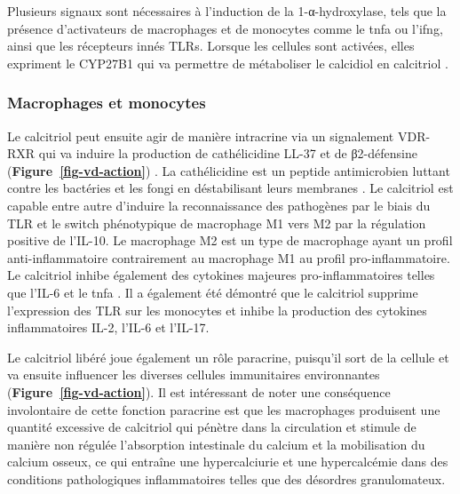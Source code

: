 \documentclass[
  a4paper,
  DIV=11,
  numbers=noendperiod,
  listof=totoc]{scrreprt}
\begin{document}
Plusieurs signaux sont nécessaires à l'induction de la 1-α-hydroxylase,
tels que la présence d'activateurs de macrophages et de monocytes comme
le \ac{tnfa} ou l'\ac{ifng}, ainsi que les récepteurs innés \acp{TLR}.
Lorsque les cellules sont activées, elles expriment le \ac{CYP27B1} qui
va permettre de métaboliser le calcidiol en calcitriol
\autocite{Liu.2006,Charoenngam.2020}.

\hypertarget{macrophages-et-monocytes}{%
\subsubsection{Macrophages et
monocytes}\label{macrophages-et-monocytes}}

Le calcitriol peut ensuite agir de manière intracrine via un signalement
VDR-RXR qui va induire la production de cathélicidine LL-37 et de
β2-défensine (\textbf{Figure~\ref{fig-vd-action}})
\autocite{Caprio.2017}. La cathélicidine est un peptide antimicrobien
luttant contre les bactéries et les fongi en déstabilisant leurs
membranes \autocite{Charoenngam.2020}. Le calcitriol est capable entre
autre d'induire la reconnaissance des pathogènes par le biais du
\ac{TLR} et le switch phénotypique de macrophage M1 vers M2 par la
régulation positive de l'\ac{IL-10}. Le macrophage M2 est un type de
macrophage ayant un profil anti-inflammatoire contrairement au
macrophage M1 au profil pro-inflammatoire. Le calcitriol inhibe
également des cytokines majeures pro-inflammatoires telles que
l'\ac{IL-6} et le \ac{tnfa} \autocite{Meza-Meza.2022,Caprio.2017}. Il a
également été démontré que le calcitriol supprime l'expression des
\ac{TLR} sur les monocytes et inhibe la production des cytokines
inflammatoires \ac{IL-2}, l'\ac{IL-6} et l'\ac{IL-17}.

Le calcitriol libéré joue également un rôle paracrine, puisqu'il sort de
la cellule et va ensuite influencer les diverses cellules immunitaires
environnantes (\textbf{Figure~\ref{fig-vd-action}}). Il est intéressant
de noter une conséquence involontaire de cette fonction paracrine est
que les macrophages produisent une quantité excessive de calcitriol qui
pénètre dans la circulation et stimule de manière non régulée
l'absorption intestinale du calcium et la mobilisation du calcium
osseux, ce qui entraîne une hypercalciurie et une hypercalcémie dans des
conditions pathologiques inflammatoires telles que des désordres
granulomateux.
\end{document}
